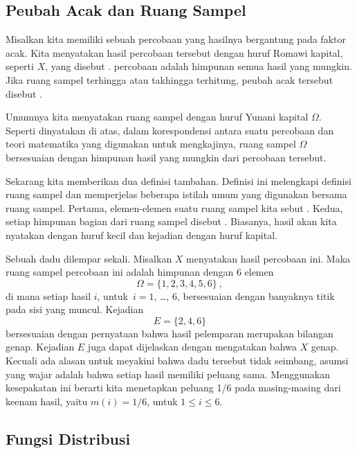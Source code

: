\subsection*{Peubah Acak dan Ruang Sampel}

\begin{definition}\label{def 1.1} 
Misalkan kita memiliki sebuah percobaan yang hasilnya bergantung pada faktor acak.
Kita menyatakan hasil percobaan tersebut dengan
huruf Romawi kapital, seperti $X$, yang disebut .
 percobaan adalah himpunan semua 
hasil yang mungkin.  Jika ruang sampel terhingga atau takhingga terhitung, peubah acak
tersebut disebut .
\end{definition}
Umumnya kita menyatakan ruang sampel dengan huruf Yunani kapital $\Omega$.  Seperti
dinyatakan di atas, dalam korespondensi antara suatu percobaan dan
teori matematika yang digunakan untuk mengkajinya, ruang sampel $\Omega$ bersesuaian dengan
himpunan hasil yang mungkin dari percobaan tersebut.    
\par
Sekarang kita memberikan dua definisi tambahan.  Definisi ini melengkapi
definisi ruang sampel dan memperjelas beberapa istilah umum yang digunakan
bersama ruang sampel.  Pertama, elemen-elemen suatu ruang sampel kita sebut
.  Kedua, setiap himpunan bagian dari ruang sampel disebut 
. Biasanya, hasil akan kita nyatakan dengan huruf kecil dan
kejadian dengan huruf kapital.
 
\begin{example}\label{exam 1.5}
Sebuah dadu dilempar sekali.  Misalkan $X$ menyatakan hasil percobaan ini.  Maka ruang
sampel percobaan ini adalah himpunan dengan 6 elemen
$$
\Omega = \{1,2,3,4,5,6\}\ ,
$$
di mana setiap hasil $i$, untuk~$i = 1$, \dots, 6, bersesuaian dengan banyaknya
titik pada sisi yang muncul.  Kejadian
$$
E = \{2,4,6\}
$$
bersesuaian dengan pernyataan bahwa hasil pelemparan merupakan bilangan genap.  Kejadian $E$
juga dapat dijelaskan dengan mengatakan bahwa $X$ genap.  Kecuali ada alasan untuk meyakini bahwa dadu
tersebut tidak seimbang, asumsi yang wajar adalah bahwa setiap hasil memiliki peluang sama.  Menggunakan
kesepakatan ini berarti kita menetapkan peluang 1/6 pada masing-masing dari keenam hasil, yaitu $m(i) =
1/6$, untuk $1 \le i \le 6$.
\end{example}

\subsection*{Fungsi Distribusi}

